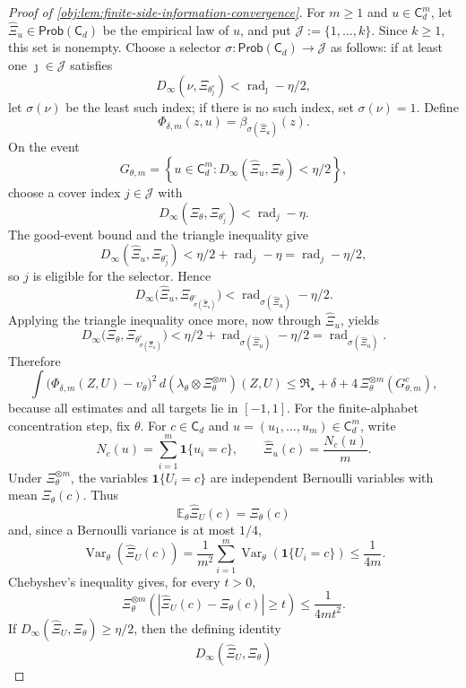 \begin{proof}[Proof of \cref{obj:lem:finite-side-information-convergence}]
For \(m\ge1\) and \(u\in\mathsf C_d^m\), let \(\widehat\Xi_u\in\mathsf{Prob}(\mathsf C_d)\) be the
empirical law of \(u\), and put \(\mathcal J:=\{1,\ldots,k\}\). Since \(k\ge1\), this set is
nonempty. Choose a selector \(\sigma:\mathsf{Prob}(\mathsf C_d)\to\mathcal J\) as follows: if at
least one \(\jmath\in\mathcal J\) satisfies
\[
D_\infty(\nu,\Xi_{\theta^\circ_{\jmath}})
<
\operatorname{rad}_{\jmath}-\eta/2,
\]
let \(\sigma(\nu)\) be the least such index; if there is no such index, set
\(\sigma(\nu)=1\). Define
\[
\Phi_{\delta,m}(z,u)=\beta_{\sigma(\widehat\Xi_u)}(z).
\]
On the event
\[
G_{\theta,m}
=
\left\{
u\in\mathsf C_d^m:
D_\infty(\widehat\Xi_u,\Xi_\theta)<\eta/2
\right\},
\]
choose a cover index \(j\in\mathcal J\) with
\[
D_\infty(\Xi_\theta,\Xi_{\theta_j^\circ})
<\operatorname{rad}_j-\eta.
\]
The good-event bound and the triangle inequality give
\[
D_\infty(\widehat\Xi_u,\Xi_{\theta_j^\circ})
<\eta/2+\operatorname{rad}_j-\eta
=\operatorname{rad}_j-\eta/2,
\]
so \(j\) is eligible for the selector. Hence
\[
D_\infty\bigl(\widehat\Xi_u,
\Xi_{\theta^\circ_{\sigma(\widehat\Xi_u)}}\bigr)
<\operatorname{rad}_{\sigma(\widehat\Xi_u)}-\eta/2.
\]
Applying the triangle inequality once more, now through \(\widehat\Xi_u\), yields
\[
D_\infty\bigl(\Xi_\theta,\Xi_{\theta^\circ_{\sigma(\widehat\Xi_u)}}\bigr)
<
\eta/2+\operatorname{rad}_{\sigma(\widehat\Xi_u)}-\eta/2
=
\operatorname{rad}_{\sigma(\widehat\Xi_u)}.
\]
Therefore
\[
\int
\bigl(\Phi_{\delta,m}(Z,U)-\upsilon_\theta\bigr)^2\,
d(\lambda_\theta\otimes\Xi_\theta^{\otimes m})(Z,U)
\le
\mathfrak R_\star+\delta
+
4\,\Xi_\theta^{\otimes m}(G_{\theta,m}^{c}),
\]
because all estimates and all targets lie in \([-1,1]\). For the finite-alphabet concentration step, fix \(\theta\). For \(c\in\mathsf C_d\) and
\(u=(u_1,\ldots,u_m)\in\mathsf C_d^m\), write
\[
N_c(u)=\sum_{i=1}^m\mathbf 1\{u_i=c\},
\qquad
\widehat\Xi_u(c)=\frac{N_c(u)}m .
\]
Under \(\Xi_\theta^{\otimes m}\), the variables \(\mathbf 1\{U_i=c\}\) are independent Bernoulli variables with mean \(\Xi_\theta(c)\). Thus
\[
\mathbb E_\theta\widehat\Xi_U(c)=\Xi_\theta(c)
\]
and, since a Bernoulli variance is at most \(1/4\),
\[
\operatorname{Var}_\theta\!\left(\widehat\Xi_U(c)\right)
=
\frac{1}{m^2}\sum_{i=1}^m
\operatorname{Var}_\theta\!\left(\mathbf 1\{U_i=c\}\right)
\le
\frac{1}{4m} .
\]
Chebyshev's inequality gives, for every \(t>0\),
\[
\Xi_\theta^{\otimes m}\left(
\left|\widehat\Xi_U(c)-\Xi_\theta(c)\right|
\ge t
\right)
\le
\frac{1}{4mt^2} .
\]
If \(D_\infty(\widehat\Xi_U,\Xi_\theta)\ge\eta/2\), then the defining identity
\[
D_\infty(\widehat\Xi_U,\Xi_\theta)
\]
\end{proof}
